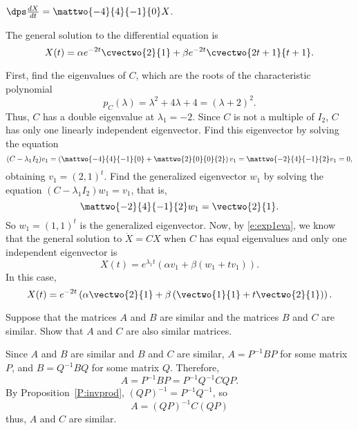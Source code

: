 \documentclass{article}
\begin{document}
\begin{exercise}  \label{c6.6.2d}
$\dps\frac{dX}{dt} = \mattwo{-4}{4}{-1}{0} X$.

\begin{solution}
\ans The general solution to the differential equation is
\[
X(t) = \alpha e^{-2t}\cvectwo{2}{1} + \beta e^{-2t}\cvectwo{2t + 1}{t + 1}.
\]

\soln First, find the eigenvalues of $C$, which are the roots of the
characteristic polynomial
\[
p_C(\lambda) = \lambda^2 + 4\lambda + 4 = (\lambda + 2)^2.
\]
Thus, $C$ has a double eigenvalue at $\lambda_1 = -2$.  Since $C$ is not
a multiple of $I_2$, $C$ has only one linearly independent eigenvector.
Find this eigenvector by solving the equation
\[
(C - \lambda_1I_2)v_1 = \left(\mattwo{-4}{4}{-1}{0} + \mattwo{2}{0}{0}{2}
\right)v_1 = \mattwo{-2}{4}{-1}{2}v_1 = 0,
\]
obtaining $v_1 = (2,1)^t$.  Find the generalized eigenvector $w_1$ by
solving the equation $(C - \lambda_1 I_2)w_1 = v_1$, that is,
\[
\mattwo{-2}{4}{-1}{2}w_1 = \vectwo{2}{1}.
\]
So $w_1 = (1,1)^t$ is the generalized eigenvector.
Now, by \eqref{e:exp1eva}, we know that the
general solution to $\dot{X} = CX$ when $C$ has equal eigenvalues and only
one independent eigenvector is
\[
X(t) = e^{\lambda_1 t}(\alpha v_1 + \beta(w_1 + tv_1)).
\]
In this case,
\[
X(t) = e^{-2t}\left(\alpha \vectwo{2}{1} + \beta\left(\vectwo{1}{1} +
t\vectwo{2}{1}\right)\right).
\]






\end{solution}
\end{exercise}





\problemlabel



\begin{exercise} \label{c6.5.1}
Suppose that the matrices $A$ and $B$ are similar and the matrices
$B$ and $C$ are similar.  Show that $A$ and $C$ are also similar
matrices.

\begin{solution}

Since $A$ and $B$ are similar and $B$ and $C$ are similar,
$A = P^{-1}BP$ for some matrix $P$, and $B = Q^{-1}BQ$
for some matrix $Q$.  Therefore,
\[ A = P^{-1}BP = P^{-1}Q^{-1}CQP. \]
By Proposition~\ref{P:invprod}, $(QP)^{-1} = P^{-1}Q^{-1}$, so
\[ A = (QP)^{-1}C(QP) \]
thus, $A$ and $C$ are similar.

\end{solution}
\end{exercise}
\end{document}
